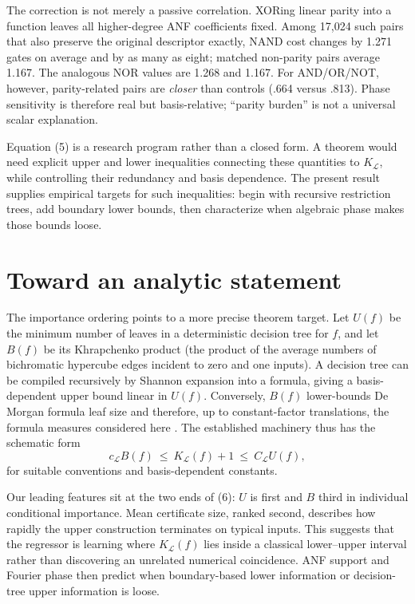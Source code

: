 \documentclass[10pt]{article}
\theoremstyle{definition}
\begin{document}
The correction is not merely a passive correlation.  XORing linear parity
into a function leaves all higher-degree ANF coefficients fixed.  Among 17,024
such pairs that also preserve the original descriptor exactly, NAND cost
changes by 1.271 gates on average and by as many as eight; matched non-parity
pairs average 1.167.  The analogous NOR values are 1.268 and 1.167.  For
AND/OR/NOT, however, parity-related pairs are \emph{closer} than controls
(.664 versus .813).  Phase sensitivity is therefore real but basis-relative;
``parity burden'' is not a universal scalar explanation.

Equation (5) is a research program rather than a closed form.  A theorem would
need explicit upper and lower inequalities connecting these quantities to
$K_{\mathcal L}$, while controlling their redundancy and basis dependence.
The present result supplies empirical targets for such inequalities: begin
with recursive restriction trees, add boundary lower bounds, then characterize
when algebraic phase makes those bounds loose.

\section{Toward an analytic statement}

The importance ordering points to a more precise theorem target.  Let $U(f)$
be the minimum number of leaves in a deterministic decision tree for $f$, and
let $B(f)$ be its Khrapchenko product (the product of the average numbers of
bichromatic hypercube edges incident to zero and one inputs).  A decision tree
can be compiled recursively by Shannon expansion into a formula, giving a
basis-dependent upper bound linear in $U(f)$.  Conversely, $B(f)$ lower-bounds
De Morgan formula leaf size and therefore, up to constant-factor translations,
the formula measures considered here \cite{jukna2012}.  The established
machinery thus has the schematic form
\[
 c_{\mathcal L}B(f)\ \le\ K_{\mathcal L}(f)+1\ \le\
 C_{\mathcal L}U(f),                                                   \tag{6}
\]
for suitable conventions and basis-dependent constants.

Our leading features sit at the two ends of (6): $U$ is first and $B$ third in
individual conditional importance.  Mean certificate size, ranked second,
describes how rapidly the upper construction terminates on typical inputs.
This suggests that the regressor is learning where $K_{\mathcal L}(f)$ lies
inside a classical lower--upper interval rather than discovering an unrelated
numerical coincidence.  ANF support and Fourier phase then predict when
boundary-based lower information or decision-tree upper information is loose.
\end{document}
